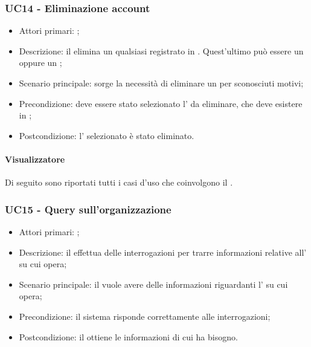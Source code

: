 \documentclass[../analisi-dei-requisiti]{subfiles}
\begin{document}
\subsubsection{UC14 - Eliminazione account}
\label{subsub:UC14}

\begin{itemize}
\item Attori primari: ;
\item Descrizione: il  elimina un qualsiasi  registrato in . Quest'ultimo può essere un  oppure
un ;
\item Scenario principale: sorge la necessità di eliminare un  per sconosciuti motivi; 
\item Precondizione: deve essere stato selezionato l' da eliminare, che deve esistere in ;
\item Postcondizione: l' selezionato è stato eliminato.

\end{itemize}



\paragraph{Visualizzatore}
Di seguito sono riportati tutti i casi d'uso che coinvolgono il  .


\subsubsection{UC15 - Query sull'organizzazione}
\label{subsub:UC15}

\begin{itemize}
\item Attori primari: ;
\item Descrizione: il  effettua delle interrogazioni per trarre informazioni relative all' su cui opera;
\item Scenario principale: il  vuole avere delle informazioni riguardanti l' su cui opera;
\item Precondizione: il sistema risponde correttamente alle interrogazioni;
\item Postcondizione: il  ottiene le informazioni di cui ha bisogno.

\end{itemize}
\end{document}
